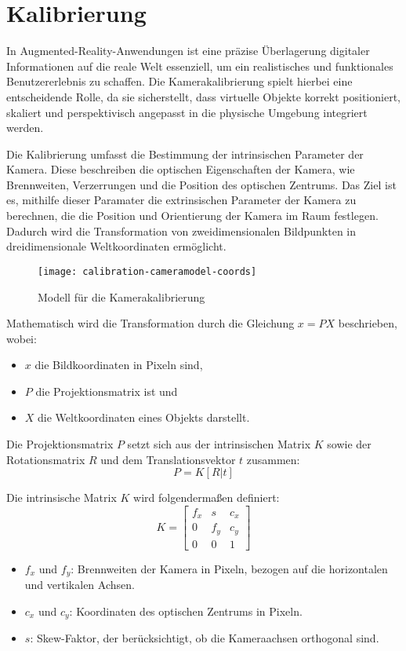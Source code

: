 \section{Kalibrierung}

In Augmented-Reality-Anwendungen ist eine präzise Überlagerung digitaler Informationen auf die reale Welt essenziell, um ein realistisches und funktionales Benutzererlebnis zu schaffen. Die Kamerakalibrierung spielt hierbei eine entscheidende Rolle, da sie sicherstellt, dass virtuelle Objekte korrekt positioniert, skaliert und perspektivisch angepasst in die physische Umgebung integriert werden.

Die Kalibrierung umfasst die Bestimmung der intrinsischen Parameter der Kamera. Diese beschreiben die optischen Eigenschaften der Kamera, wie Brennweiten, Verzerrungen und die Position des optischen Zentrums. Das Ziel ist es, mithilfe dieser Paramater die extrinsischen Parameter der Kamera zu berechnen, die die Position und Orientierung der Kamera im Raum festlegen. Dadurch wird die Transformation von zweidimensionalen Bildpunkten in dreidimensionale Weltkoordinaten ermöglicht.

\begin{figure}
    \centering
    \texttt{[image: calibration-cameramodel-coords]}
    \caption{Modell für die Kamerakalibrierung\label{fig:Kalibrierung}}\par
\end{figure}

Mathematisch wird die Transformation durch die Gleichung \( x = PX \) beschrieben, wobei:

\begin{itemize}
    \item \( x \) die Bildkoordinaten in Pixeln sind,
    \item \( P \) die Projektionsmatrix ist und
    \item \( X \) die Weltkoordinaten eines Objekts darstellt.
\end{itemize}

Die Projektionsmatrix \( P \) setzt sich aus der intrinsischen Matrix \( K \) sowie der Rotationsmatrix \( R \) und dem Translationsvektor \( t \) zusammen:
\[
P = K[R|t]
\]

Die intrinsische Matrix \( K \) wird folgendermaßen definiert:
\[
K = 
\begin{bmatrix}
f_x & s & c_x \\
0 & f_y & c_y \\
0 & 0 & 1
\end{bmatrix}
\]
\begin{itemize}
    \item \( f_x \) und \( f_y \): Brennweiten der Kamera in Pixeln, bezogen auf die horizontalen und vertikalen Achsen.
    \item \( c_x \) und \( c_y \): Koordinaten des optischen Zentrums in Pixeln.
    \item \( s \): Skew-Faktor, der berücksichtigt, ob die Kameraachsen orthogonal sind.
\end{itemize}

